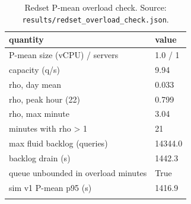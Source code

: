 \begin{table}[htbp]
\centering
\footnotesize
\caption{Redset P-mean overload check. Source: \texttt{results/redset\_overload\_check.json}.}
\label{tab:overload}
\setlength{\tabcolsep}{3pt}
\begin{tabular}{ll}
\toprule
\textbf{quantity} & \textbf{value} \\
\midrule
P-mean size (vCPU) / servers & 1.0 / 1 \\
capacity (q/s) & 9.94 \\
rho, day mean & 0.033 \\
rho, peak hour (22) & 0.799 \\
rho, max minute & 3.04 \\
minutes with rho > 1 & 21 \\
max fluid backlog (queries) & 14344.0 \\
backlog drain (s) & 1442.3 \\
queue unbounded in overload minutes & True \\
sim v1 P-mean p95 (s) & 1416.9 \\
\botrule
\end{tabular}
\end{table}

